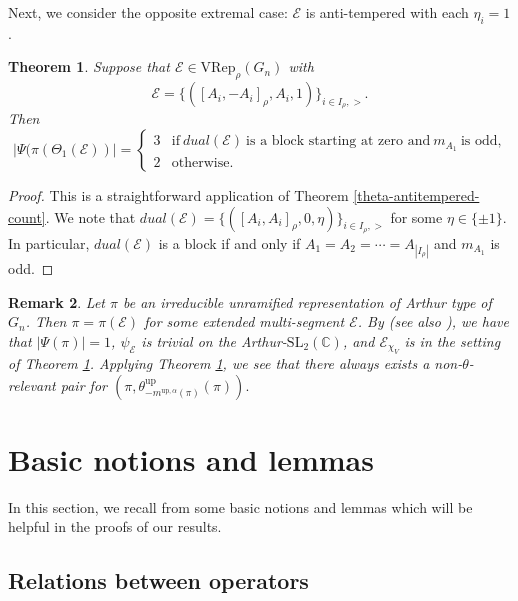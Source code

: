 \documentclass[11pt,letterpaper]{amsart}
\newcommand{\VRep}{{\mathrm{VRep}}}
\newcommand{\up}{{\mathrm{up}}}
\newcommand{\SL}{\mathrm{SL}}
\newcommand{\EE}{\mathcal{E}}
\newtheorem{thm}{Theorem}[section]
\newtheorem{rmk}[thm]{Remark}
\numberwithin{equation}{section}
\begin{document}
Next, we consider the opposite extremal case: $\EE$ is anti-tempered with each $\eta_i=1$.


\begin{thm}\label{thm-unram-theta-count}
    Suppose that $\EE\in\VRep_\rho(G_n)$ with
    \[
    \EE=\{([A_i,-A_i]_\rho,A_i,1)\}_{i\in I_\rho,>}.
    \]
    Then
    \[
    |\Psi(\pi(\Theta_1(\EE))|=\begin{cases}
        3 & \mathrm{if} \ dual(\EE) \ \text{is a block starting at zero and} \ m_{A_1} \ \text{is odd,}  \\
        2 & \mathrm{otherwise.} 
    \end{cases}
    \]
\end{thm}

\begin{proof}
    This is a straightforward application of Theorem \ref{theta-antitempered-count}. We note that $dual(\EE)=\{([A_i,A_i]_\rho,0,\eta)\}_{i\in I_\rho,>}$ for some $\eta\in\{\pm1\}.$ In particular, $dual(\EE)$ is a block if and only if $A_1=A_2=\cdots=A_{|I_\rho|}$ and $m_{A_1}$ is odd. 
\end{proof}

\begin{rmk}
Let $\pi$ be an irreducible unramified representation of Arthur type of $G_n$. Then $\pi=\pi(\EE)$ for some extended multi-segment $\EE$. By \cite[Proposition 6.4]{Moe09b} (see also \cite[Theorem 5.4 and Proposition 5.5]{HLL24}), we have that $|\Psi(\pi)|=1$,  $\psi_\EE$ is trivial on the Arthur-$\SL_2(\mathbb{C})$, and $\EE_{\chi_V}$ is in the setting of Theorem \ref{thm-unram-theta-count}. Applying Theorem \ref{thm-unram-theta-count}, we see that there always exists a non-$\theta$-relevant pair for $(\pi,\theta_{-m^{\up,\alpha}(\pi)}^\up(\pi)).$
\end{rmk}




\section{Basic notions and lemmas}\label{sec basic notions and lemmas}

In this section, we recall from \cite[\S 4]{HKT26} some basic notions and lemmas which will be helpful in the proofs of our results.

\subsection{Relations between operators}
\end{document}
